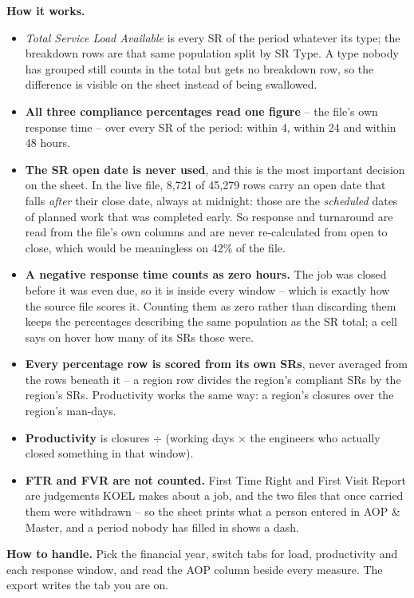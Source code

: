 \documentclass[11pt,a4paper]{article}
\newcommand{\devproc}{\textbf{How it works.}\par}
\newcommand{\handle}[1]{\textbf{How to handle.} #1\par}
\begin{document}
\devproc
\begin{itemize}
  \item \emph{Total Service Load Available} is every SR of the period whatever its type;
  the breakdown rows are that same population split by SR Type. A type nobody has grouped
  still counts in the total but gets no breakdown row, so the difference is visible on
  the sheet instead of being swallowed.
  \item \textbf{All three compliance percentages read one figure} -- the file's own
  response time -- over every SR of the period: within 4, within 24 and within 48 hours.
  \item \textbf{The SR open date is never used}, and this is the most important decision
  on the sheet. In the live file, 8,721 of 45,279 rows carry an open date that falls
  \emph{after} their close date, always at midnight: those are the \emph{scheduled} dates
  of planned work that was completed early. So response and turnaround are read from the
  file's own columns and are never re-calculated from open to close, which would be
  meaningless on 42\% of the file.
  \item \textbf{A negative response time counts as zero hours.} The job was closed before
  it was even due, so it is inside every window -- which is exactly how the source file
  scores it. Counting them as zero rather than discarding them keeps the percentages
  describing the same population as the SR total; a cell says on hover how many of its
  SRs those were.
  \item \textbf{Every percentage row is scored from its own SRs}, never averaged from the
  rows beneath it -- a region row divides the region's compliant SRs by the region's SRs.
  Productivity works the same way: a region's closures over the region's man-days.
  \item \textbf{Productivity} is closures $\div$ (working days $\times$ the engineers who
  actually closed something in that window).
  \item \textbf{FTR and FVR are not counted.} First Time Right and First Visit Report are
  judgements KOEL makes about a job, and the two files that once carried them were
  withdrawn -- so the sheet prints what a person entered in AOP \& Master, and a period
  nobody has filled in shows a dash.
\end{itemize}

\handle{Pick the financial year, switch tabs for load, productivity and each response
window, and read the AOP column beside every measure. The export writes the tab you are
on.}
\end{document}
